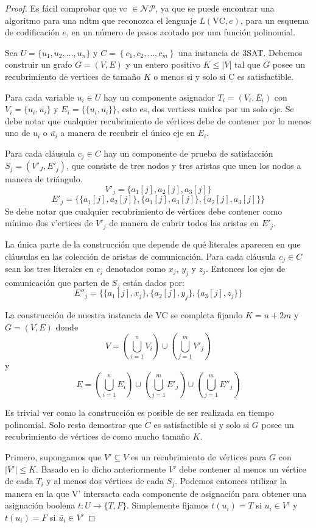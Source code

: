 \documentclass[11pt, a4paper]{memoir}
\begin{document}
\begin{proof}

Es fácil comprobar que \gls{vc}	$\in \mathcal{NP}$, ya que se puede encontrar una algoritmo para una \gls{ndtm} que reconozca el lenguaje $L(\mbox{VC},e)$, para un esquema de codificación $e$, en un número de pasos acotado por una función polinomial.

Sea $U=\{u_1,u_2,\ldots,u_n\}$ y $C=\left \{c_1, c_2, \dots, c_m \right \}$ una instancia de 3SAT. Debemos construir un grafo $G=(V,E)$ y un entero positivo $K \le |V|$ tal que $G$ posee un recubrimiento de vertices de tamaño $K$ o menos si y solo si C es satisfactible.

Para cada variable $u_i \in U$ hay un componente asignador $T_i=(V_i,E_i)$ con $V_i=\{u_i, \bar{u_i}\}$ y $E_i=\{\{u_i, \bar{u_i}\}\}$, esto es, dos vertices unidos por un solo eje. Se debe notar que cualquier recubrimiento de vértices debe de contener por lo menos uno de $u_i$ o $\bar{u_i}$ a manera de recubrir el único eje en $E_i$.

Para cada cláusula $c_j \in C$ hay un componente de prueba de satisfacción $S_j=(V'_J,E'_j)$, que consiste de tres nodos y tres aristas que unen los nodos a manera de triángulo.
\[V'_j=\{a_1[j],a_2[j],a_3[j]\}\]
\[E'_j=\{\{a_1[j],a_2[j]\},\{a_1[j],a_3[j]\},\{a_2[j],a_3[j]\}\}\]
Se debe notar que cualquier recubrimiento de vértices debe contener como mínimo dos v'ertices de $V'_j$ de manera de cubrir todos las aristas en $E'_j$.

La única parte de la construcción que depende de qué literales aparecen en que cláusulas en las colección de aristas de comunicación. Para cada cláusula $c_j\in C$ sean los tres literales en $c_j$ denotados como $x_j$, $y_j$ y $z_j$. Entonces los ejes de comunicación que parten de $S_j$ están dados por:
\[E''_j=\{ \{a_1[j],x_j\}, \{a_2[j],y_j\}, \{a_3[j],z_j\} \}\]

La construcción de nuestra instancia de VC se completa fijando $K=n+2m$ y $G=(V,E)$ donde
\[V=(\bigcup^n_{i=1}V_i)\cup (\bigcup^m_{j=1}V'_j)\]
y
\[E=(\bigcup^n_{i=1}E_i)\cup (\bigcup^m_{j=1}E'_j)\cup (\bigcup^m_{j=1}E''_j)\]

Es trivial ver como la construcción es posible de ser realizada en tiempo polinomial. Solo resta demostrar que $C$ es satisfactible si y solo si $G$ posee un recubrimiento de vértices de como mucho tamaño $K$.

Primero, supongamos que $V' \subseteq V$ es un recubrimiento de vértices para $G$ con $|V'| \le K$. Basado en lo dicho anteriormente $V'$ debe contener al menos un vértice de cada $T_i$ y al menos dos vértices de cada $S_j$. Podemos entonces utilizar la manera en la que V' intersacta cada componente de asignación para obtener una asignación boolena $t: U \rightarrow \{T,F\}$. Simplemente fijamos $t(u_i)=T$ si $u_i \in V'$ y $t(u_i) = F$ si $\bar{u_i}\in V'$


\end{proof}
\end{document}
